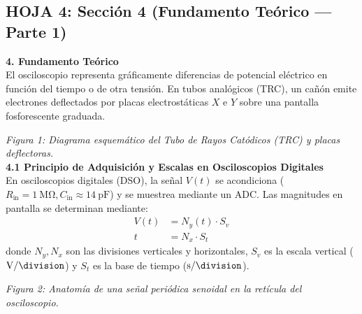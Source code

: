 \documentclass[a4paper, 11pt]{article}
\begin{document}
\subsection*{\color{uni-blue} HOJA 4: Sección 4 (Fundamento Teórico --- Parte 1)}
\begin{tcolorbox}[title=Texto a Escribir: Sección 4 (Fundamento Teórico), colframe=black]
    \small
    \textbf{\large 4. Fundamento Teórico}\\[0.15cm]
    El osciloscopio representa gráficamente diferencias de potencial eléctrico en función del tiempo o de otra tensión. En tubos analógicos (TRC), un cañón emite electrones deflectados por placas electrostáticas $X$ e $Y$ sobre una pantalla fosforescente graduada.\\[0.15cm]
    
    \begin{center}
    \end{center}
    {\scriptsize\textit{Figura 1: Diagrama esquemático del Tubo de Rayos Catódicos (TRC) y placas deflectoras.}}\\[0.2cm]
    
    \textbf{4.1 Principio de Adquisición y Escalas en Osciloscopios Digitales}\\[0.1cm]
    En osciloscopios digitales (DSO), la señal $V(t)$ se acondiciona ($R_{\text{in}} = \qty{1}{\mega\ohm}, C_{\text{in}} \approx \qty{14}{\pico\farad}$) y se muestrea mediante un ADC. Las magnitudes en pantalla se determinan mediante:
    \begin{align}
        V(t) &= N_y(t) \cdot S_v \tag{1} \\
        t &= N_x \cdot S_t \tag{2}
    \end{align}
    donde $N_y, N_x$ son las divisiones verticales y horizontales, $S_v$ es la escala vertical ($\unit{\volt\per\division}$) y $S_t$ es la base de tiempo ($\unit{\second\per\division}$).\\[0.2cm]
    
    \begin{center}
    \end{center}
    {\scriptsize\textit{Figura 2: Anatomía de una señal periódica senoidal en la retícula del osciloscopio.}}
\end{tcolorbox}
\end{document}
